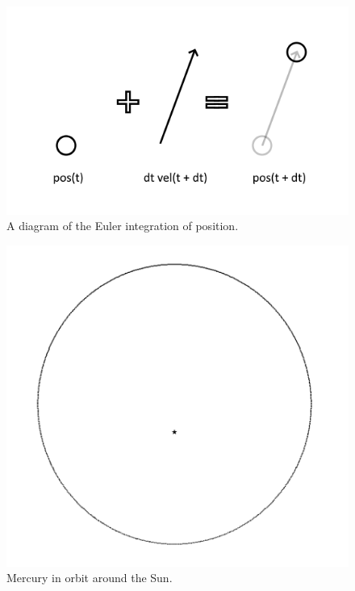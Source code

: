 \documentclass[12pt]{article}
\begin{document}
\begin{figure} 
\centering
\label{fig4}
  \includegraphics[width = 6 in]{position.png}
  \caption{
A diagram of the Euler integration of position.
}
\end{figure}






\begin{figure} 
\centering
  \includegraphics[width = 4 in]{mercury.png}
  \caption{
Mercury in orbit around the Sun.
}
\end{figure}
\end{document}
